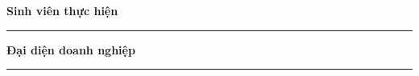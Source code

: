 \vspace{1cm}

\begin{center}
\begin{minipage}[t]{0.4\textwidth}
    \centering
    \textbf{Sinh viên thực hiện}\\[0.2cm]

    \vspace{2.5cm}

    \rule{0.8\linewidth}{0.4pt}
\end{minipage}
\hfill
\begin{minipage}[t]{0.4\textwidth}
    \centering
    \textbf{Đại diện doanh nghiệp}\\[0.2cm]

    \vspace{2.5cm}

    \rule{0.8\linewidth}{0.4pt}
\end{minipage}
\end{center}